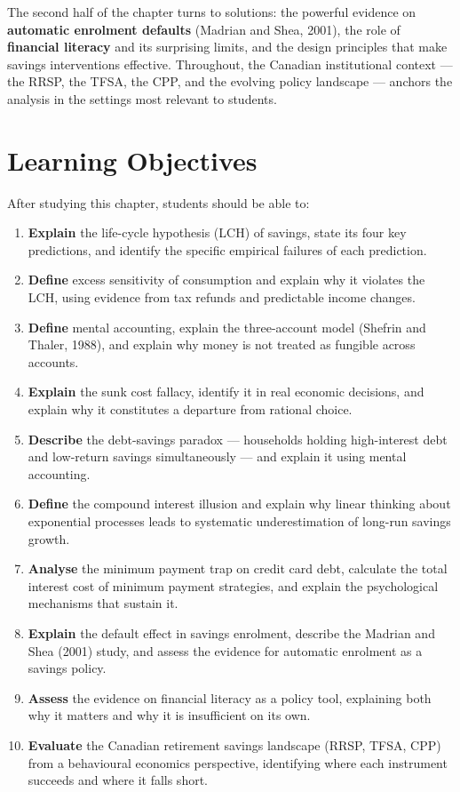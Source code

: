 \documentclass[12pt, letterpaper]{article}
\begin{document}
The second half of the chapter turns to solutions: the powerful evidence on \textbf{automatic enrolment defaults} (Madrian and Shea, 2001), the role of \textbf{financial literacy} and its surprising limits, and the design principles that make savings interventions effective. Throughout, the Canadian institutional context --- the RRSP, the TFSA, the CPP, and the evolving policy landscape --- anchors the analysis in the settings most relevant to students.

\medskip


\section*{Learning Objectives}


After studying this chapter, students should be able to:

\begin{enumerate}
\item \textbf{Explain} the life-cycle hypothesis (LCH) of savings, state its four key predictions, and identify the specific empirical failures of each prediction.
\item \textbf{Define} excess sensitivity of consumption and explain why it violates the LCH, using evidence from tax refunds and predictable income changes.
\item \textbf{Define} mental accounting, explain the three-account model (Shefrin and Thaler, 1988), and explain why money is not treated as fungible across accounts.
\item \textbf{Explain} the sunk cost fallacy, identify it in real economic decisions, and explain why it constitutes a departure from rational choice.
\item \textbf{Describe} the debt-savings paradox --- households holding high-interest debt and low-return savings simultaneously --- and explain it using mental accounting.
\item \textbf{Define} the compound interest illusion and explain why linear thinking about exponential processes leads to systematic underestimation of long-run savings growth.
\item \textbf{Analyse} the minimum payment trap on credit card debt, calculate the total interest cost of minimum payment strategies, and explain the psychological mechanisms that sustain it.
\item \textbf{Explain} the default effect in savings enrolment, describe the Madrian and Shea (2001) study, and assess the evidence for automatic enrolment as a savings policy.
\item \textbf{Assess} the evidence on financial literacy as a policy tool, explaining both why it matters and why it is insufficient on its own.
\item \textbf{Evaluate} the Canadian retirement savings landscape (RRSP, TFSA, CPP) from a behavioural economics perspective, identifying where each instrument succeeds and where it falls short.
\end{enumerate}
\end{document}
